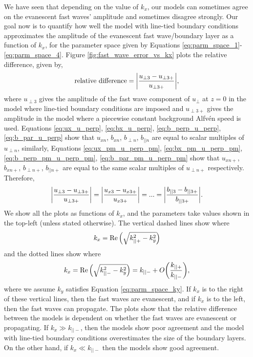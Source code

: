 \documentclass[linenumbers]{aastex63}
\begin{document}
We have seen that depending on the value of $k_x$, our models can sometimes agree on the evanescent fast waves' amplitude and sometimes disagree strongly. Our goal now is to quantify how well the model with line-tied boundary conditions approximates the amplitude of the evanescent fast wave/boundary layer as a function of $k_x$, for the parameter space given by Equations \eqref{eq:parm_space_1}-\eqref{eq:parm_space_4}. Figure \ref{fig:fast_wave_error_vs_kx} plots the relative difference, given by,
\begin{equation}
    \label{eq:relative_difference}
    \text{relative difference} = \abs{\frac{u_{\perp3} - u_{\perp 3+}}{u_{\perp 3+}}},
\end{equation}
where $u_{\perp3}$ gives the amplitude of the fast wave component of $u_\perp$ at $z=0$ in the model where line-tied boundary conditions are imposed and $u_{\perp 3+}$ gives the amplitude in the model where a piecewise constant background Alfv\'en speed is used. Equations \eqref{eq:ux_u_perp}, \eqref{eq:bx_u_perp}, \eqref{eq:b_perp_u_perp}, \eqref{eq:b_par_u_perp} show that $u_{xn}$, $b_{xn}$, $b_{\perp n}$, $b_{|| n}$ are equal to scalar multiples of $u_{\perp n}$, similarly, Equations \eqref{eq:ux_pm_u_perp_pm}, \eqref{eq:bx_pm_u_perp_pm}, \eqref{eq:b_perp_pm_u_perp_pm}, \eqref{eq:b_par_pm_u_perp_pm} show that $u_{xn+}$, $b_{xn+}$, $b_{\perp n+}$, $b_{|| n+}$ are equal to the same scalar multiples of $u_{\perp n+}$ respectively. Therefore,
\[
    \abs{\frac{u_{\perp3} - u_{\perp 3+}}{u_{\perp 3+}}} = \abs{\frac{u_{x3} - u_{x 3+}}{u_{x 3+}}} = ... = \abs{\frac{b_{||3} - b_{|| 3+}}{b_{|| 3+}}}.
\]
We show all the plots as functions of $k_x$, and the parameters take values shown in the top-left (unless stated otherwise). The vertical dashed lines show where 
\[k_x = \Re\qty(\sqrt{k_{||+}^2-k_y^2})\] 
and the dotted lines show where 
\[k_x = \Re\qty(\sqrt{k_{||-}^2-k_y^2})= k_{||-} + O\qty(\frac{k_{||+}}{k_{||-}}),\]
where we assume $k_y$ satisfies Equation \eqref{eq:parm_space_ky}.
If $k_x$ is to the right of these vertical lines, then the fast waves are evanescent, and if $k_x$ is to the left, then the fast waves can propagate. The plots show that the relative difference between the models is dependent on whether the fast waves are evanescent or propagating. If $k_x \gg k_{||-}$, then the models show poor agreement and the model with line-tied boundary conditions overestimates the size of the boundary layers. On the other hand, if $k_x \ll k_{||-}$
then the models show good agreement.
\end{document}
